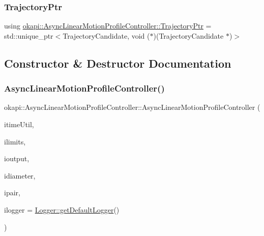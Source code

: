 \subsubsection{\texorpdfstring{TrajectoryPtr}{TrajectoryPtr}}
{\footnotesize\ttfamily using \mbox{\hyperlink{classokapi_1_1AsyncLinearMotionProfileController_a4793d9c4aebdb9a947b3c5659f919e14}{okapi\+::\+Async\+Linear\+Motion\+Profile\+Controller\+::\+Trajectory\+Ptr}} =  std\+::unique\+\_\+ptr$<$Trajectory\+Candidate, void ($\ast$)(Trajectory\+Candidate $\ast$)$>$\hspace{0.3cm}{\ttfamily [protected]}}



\subsection{Constructor \& Destructor Documentation}
\mbox{\label{classokapi_1_1AsyncLinearMotionProfileController_a6a5c233fef5c310eaac306467e6a402b}} 
\subsubsection{\texorpdfstring{AsyncLinearMotionProfileController()}{AsyncLinearMotionProfileController()}\hspace{0.1cm}{\footnotesize\ttfamily [1/2]}}
{\footnotesize\ttfamily okapi\+::\+Async\+Linear\+Motion\+Profile\+Controller\+::\+Async\+Linear\+Motion\+Profile\+Controller (\begin{DoxyParamCaption}\item[{const \mbox{\hyperlink{classokapi_1_1TimeUtil}{Time\+Util}} \&}]{itime\+Util,  }\item[{const \mbox{\hyperlink{structokapi_1_1PathfinderLimits}{Pathfinder\+Limits}} \&}]{ilimits,  }\item[{const std\+::shared\+\_\+ptr$<$ \mbox{\hyperlink{classokapi_1_1ControllerOutput}{Controller\+Output}}$<$ double $>$$>$ \&}]{ioutput,  }\item[{const Q\+Length \&}]{idiameter,  }\item[{const \mbox{\hyperlink{structokapi_1_1AbstractMotor_1_1GearsetRatioPair}{Abstract\+Motor\+::\+Gearset\+Ratio\+Pair}} \&}]{ipair,  }\item[{const std\+::shared\+\_\+ptr$<$ \mbox{\hyperlink{classokapi_1_1Logger}{Logger}} $>$ \&}]{ilogger = {\ttfamily \mbox{\hyperlink{classokapi_1_1Logger_a5053cf778b4b55acba788a3797dc96d2}{Logger\+::get\+Default\+Logger}}()} }\end{DoxyParamCaption})}

